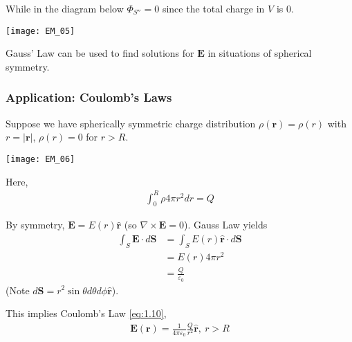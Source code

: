 \documentclass[a4paper]{article}
\begin{document}
While in the diagram below $\Phi_{S''} = 0$ since the total charge in $V$ is $0$.

\texttt{[image: EM\_05]}

Gauss' Law can be used to find solutions for $\mathbf{E}$ in situations of spherical symmetry.

\subsubsection{Application: Coulomb's Laws}

Suppose we have spherically symmetric charge distribution $\rho(\mathbf{r}) = \rho(r)$ with $r=|\mathbf{r}|$, $\rho(r) = 0$ for $r>R$.

\texttt{[image: EM\_06]}

Here,
\begin{equation*}
\begin{aligned}
\int_0^R \rho 4\pi r^2 dr = Q
\end{aligned}
\end{equation*}

By symmetry, $\mathbf{E} = E(r) \mathbf{\hat{r}}$ (so $\nabla \times \mathbf{E} = 0$). Gauss Law yields
\begin{equation*}
\begin{aligned}
\int_S \mathbf{E} \cdot d\mathbf{S} &= \int_S E(r)\mathbf{\hat{r}}\cdot d\mathbf{S}\\
&=E(r)4\pi r^2\\
&=\frac{Q}{\varepsilon_0}
\end{aligned}
\end{equation*}
(Note $d\mathbf{S} = r^2 \sin\theta d\theta d\phi \mathbf{\hat{r}}$).

This implies Coulomb's Law \eqref{eq:1.10},
\begin{equation*}\tag{2.4} \label{eq:2.4}
\begin{aligned}
\mathbf{E}(\mathbf{r}) = \frac{1}{4\pi \varepsilon_0} \frac{Q}{r^2} \mathbf{\hat{r}}, \ r>R
\end{aligned}
\end{equation*}
\end{document}
